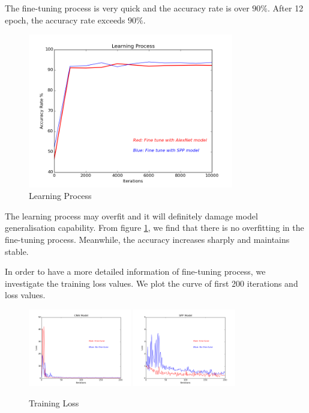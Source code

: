 The fine-tuning process is very quick and the accuracy rate is over $90\%$. After 12 epoch, the accuracy rate exceeds $90\%$. 
\graphicspath{ {./Figures/} }
\begin{figure}[!htb]
    \centering
	\includegraphics[width=0.8\textwidth]{FinetuneAccuracy.png}
    \caption{Learning Process}%
    \label{fig:finetuneprocess}%
\end{figure}

The learning process may overfit and it will definitely damage model generalisation capability. From figure \ref{fig:finetuneprocess}, we find that there is no overfitting in the fine-tuning process. Meanwhile, the accuracy increases sharply and maintains stable.

In order to have a more detailed information of fine-tuning process, we investigate the training loss values. We plot the curve of first 200 iterations and loss values.

\begin{figure}[!htb]
    \centering
	\includegraphics[width=0.4\textwidth]{finetuneCNNProcess.png}
	\includegraphics[width=0.4\textwidth]{finetuneSPPProcess.png}
    \caption{Training Loss}%
    \label{fig:FTvsSC}%
\end{figure}

